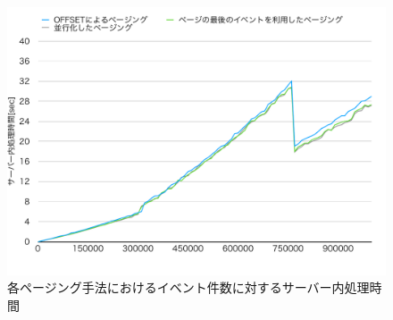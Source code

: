 \documentclass[../../../../../main]{subfiles}
\begin{document}
    \begin{figure}[H]
        \centering
        \includegraphics[width=12cm]{graph}
        \caption{各ページング手法におけるイベント件数に対するサーバー内処理時間}
        \label{fig:each-paging-server-time-app_1_1024-db_1_1024}
    \end{figure}
\end{document}
